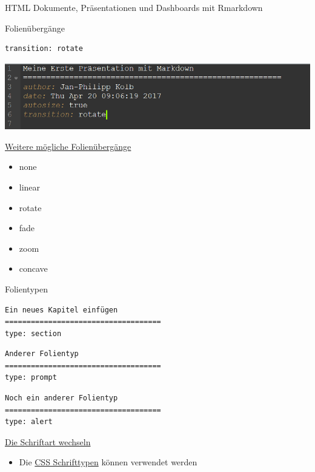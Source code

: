 \documentclass[ignorenonframetext,]{beamer}
\providecommand{\tightlist}{%
\setlength{\itemsep}{0pt}\setlength{\parskip}{0pt}}
\begin{document}
\begin{frame}[fragile]{HTML Dokumente, Präsentationen und Dashboards mit
Rmarkdown}
\begin{block}{Folienübergänge}
\begin{verbatim}
transition: rotate
\end{verbatim}

\includegraphics{./tex2pdf.9796/74c996486e4976d782e91e8c7136e37e94ba589c.png}

\end{block}

\begin{block}{\href{https://support.rstudio.com/hc/en-us/articles/200714013-Slide-Transitions-and-Navigation}{Weitere
mögliche Folienübergänge}}

\begin{itemize}
\tightlist
\item
  none
\item
  linear
\item
  rotate
\item
  fade
\item
  zoom
\item
  concave
\end{itemize}

\end{block}

\begin{block}{Folientypen}

\begin{verbatim}
Ein neues Kapitel einfügen
====================================
type: section
\end{verbatim}

\begin{verbatim}
Anderer Folientyp
====================================
type: prompt
\end{verbatim}

\begin{verbatim}
Noch ein anderer Folientyp
====================================
type: alert
\end{verbatim}

\end{block}

\begin{block}{\href{https://support.rstudio.com/hc/en-us/articles/200532307}{Die
Schriftart wechseln}}

\begin{itemize}
\tightlist
\item
  Die \href{https://www.w3schools.com/cssref/css_websafe_fonts.asp}{CSS
  Schrifttypen} können verwendet werden
\end{itemize}


\end{block}
\end{frame}
\end{document}
